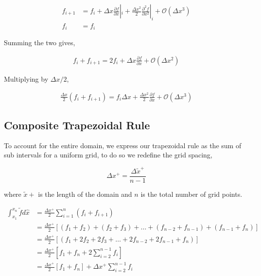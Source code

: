 \documentclass[12pt]{article}
\begin{document}
\begin{align*}
    f_{i+1} &= f_i +
    \Delta x \frac{\partial f}{\partial x}|_i +
    \frac{\Delta x^2}{2} \frac{\partial^2 f}{\partial x^2}|_i +
    \mathcal{O}\left( \Delta x^3 \right) \\
    f_i &= f_i
\end{align*}

Summing the two gives,

\begin{align*}
f_i + f_{i+1} = 2 f_i  + \Delta x \frac{\partial f}{\partial x } +
\mathcal{O}\left( \Delta x^2 \right) 
\end{align*}

Multiplying by $\Delta x /2  $,

\begin{align*}
    \frac{\Delta x}{2 }(f_i + f_{i+1} )= 
    f_i {\Delta x} + \frac{\Delta x ^2}{2}\frac{\partial f}{\partial x } +
\mathcal{O}\left( \Delta x^3 \right) 
\end{align*}


\subsection{Composite Trapezoidal Rule}
To account for the entire domain, we express our trapezoidal rule as the sum 
of sub intervals for a uniform grid, to do so we redefine the grid spacing,

\[\Delta x^+   = \frac{\Delta \widetilde{ x}^+  }{n - 1}   \]

where $\widetilde{x}+$ is the length of the domain
and $n$ is the total number of grid points. 

\begin{align*}
    \int_{x_1}^{x_n} \widetilde{f} d \hat{x} &= 
    \frac{\Delta x^+}{2} \sum_{i=1}^{n}
    \left( 
        f_i + f_{i+1}
    \right) \\ 
    &=
    \frac{\Delta x^+}{2}  
    \left[ 
        \left( f_1 + f_2 \right) +
        \left( f_2 + f_3 \right)  +\dots +
        \left( f_{n-2} + f_{n-1} \right) + 
        \left( f_{n-1} + f_{n} \right)  
    \right] \\
    &=
    \frac{\Delta x^+}{2}  
    \left[ 
        \left( f_1 +
            2f_2  +
         2f_3+\dots +
         2f_{n-2} + 
         2f_{n-1}  + 
         f_{n} \right)  
    \right] \\
    &=
    \frac{\Delta x^+}{2}
    \left[ 
        f_1 + f_n + 
        2 \sum_{i=2}^{n-1}
        f_i
    \right] \\
    &=
    \frac{\Delta x^+}{2}
    \left[ 
        f_1 + f_n \right] 
        + 
        \Delta x^+ \sum_{i=2}^{n-1}
    f_i
\end{align*}
\end{document}
